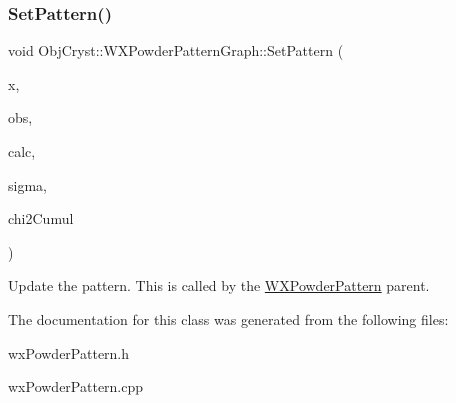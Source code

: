 \subsubsection{\texorpdfstring{SetPattern()}{SetPattern()}\hspace{0.1cm}{\footnotesize\ttfamily [2/2]}}
{\footnotesize\ttfamily void Obj\+Cryst\+::\+W\+X\+Powder\+Pattern\+Graph\+::\+Set\+Pattern (\begin{DoxyParamCaption}\item[{const Cryst\+Vector\+\_\+\+R\+E\+AL \&}]{x,  }\item[{const Cryst\+Vector\+\_\+\+R\+E\+AL \&}]{obs,  }\item[{const Cryst\+Vector\+\_\+\+R\+E\+AL \&}]{calc,  }\item[{const Cryst\+Vector\+\_\+\+R\+E\+AL \&}]{sigma,  }\item[{const Cryst\+Vector\+\_\+\+R\+E\+AL \&}]{chi2\+Cumul }\end{DoxyParamCaption})}

Update the pattern. This is called by the \mbox{\hyperlink{class_obj_cryst_1_1_w_x_powder_pattern}{W\+X\+Powder\+Pattern}} parent. 

The documentation for this class was generated from the following files\+:\begin{DoxyCompactItemize}
\item 
wx\+Powder\+Pattern.\+h\item 
wx\+Powder\+Pattern.\+cpp\end{DoxyCompactItemize}
